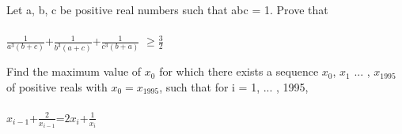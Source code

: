 

\item Let a, b, c be positive real numbers such that abc = 1. Prove that\\
\\ $\frac{1}{a^3 (b+c)}$+$\frac{1}{b^3 (a+c)}$+$\frac{1}{c^3 (b+a)}$ $\geq \frac{3}{2}$\\

\item Find the maximum value of $x_0$ for which there exists a sequence $x_0$, $x_1$ ... , $x_{1995}$
of positive reals with $x_0 = x_{1995}$, such that for i = 1, ... , 1995,\\
\\ $x_{i-1}$+$\frac{2}{x_{i-1}}$=$2x_i$+$\frac{1}{x_i}$






